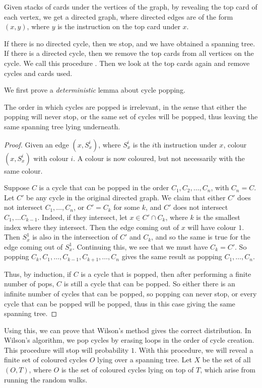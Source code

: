 \documentclass[a4paper]{article}
\begin{document}
Given stacks of cards under the vertices of the graph, by revealing the top card of each vertex, we get a directed graph, where directed edges are of the form $(x, y)$, where $y$ is the instruction on the top card under $x$.

If there is no directed cycle, then we stop, and we have obtained a spanning tree. If there is a directed cycle, then we remove the top cards from all vertices on the cycle. We call this procedure . Then we look at the top cards again and remove cycles and cards used.

We first prove a \emph{deterministic} lemma about cycle popping.
\begin{lemma}
  The order in which cycles are popped is irrelevant, in the sense that either the popping will never stop, or the same set of cycles will be popped, thus leaving the same spanning tree lying underneath.
\end{lemma}

\begin{proof}
  Given an edge $(x, S_x^i)$, where $S_x^i$ is the $i$th instruction under $x$, colour $(x, S_x^i)$ with colour $i$. A colour is now coloured, but not necessarily with the same colour.

  Suppose $C$ is a cycle that can be popped in the order $C_1, C_2, \ldots, C_n$, with $C_n = C$. Let $C'$ be any cycle in the original directed graph. We claim that either $C'$ does not intersect $C_1, \ldots, C_n$, or $C' = C_k$ for some $k$, and $C'$ does not intersect $C_1, \ldots C_{k - 1}$. Indeed, if they intersect, let $x \in C' \cap C_k$, where $k$ is the smallest index where they intersect. Then the edge coming out of $x$ will have colour $1$. Then $S_x^1$ is also in the intersection of $C'$ and $C_k$, and so the same is true for the edge coming out of $S_x^1$. Continuing this, we see that we must have $C_k = C'$. So popping $C_k, C_1, \ldots, C_{k - 1}, C_{k + 1}, \ldots, C_n$ gives the same result as popping $C_1, \ldots, C_n$.

  Thus, by induction, if $C$ is a cycle that is popped, then after performing a finite number of pops, $C$ is still a cycle that can be popped. So either there is an infinite number of cycles that can be popped, so popping can never stop, or every cycle that can be popped will be popped, thus in this case giving the same spanning tree.
\end{proof}

Using this, we can prove that Wilson's method gives the correct distribution. In Wilson's algorithm, we pop cycles by erasing loops in the order of cycle creation. This procedure will stop will probability $1$. With this procedure, we will reveal a finite set of coloured cycles $O$ lying over a spanning tree. Let $X$ be the set of all $(O, T)$, where $O$ is the set of coloured cycles lying on top of $T$, which arise from running the random walks.
\end{document}
